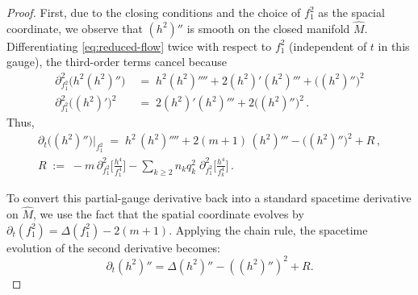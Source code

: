 \documentclass[11pt]{amsart}
\theoremstyle{plain}
\numberwithin{equation}{section}
\theoremstyle{definition}
\theoremstyle{remark}
\begin{document}
\begin{proof}
First, due to the closing conditions and the choice of $f_1^2$ as the spacial coordinate, we observe that $( h^2 )''$ is smooth on the closed manifold $\widehat{M}$. Differentiating \eqref{eq:reduced-flow} twice with respect to $f_1^2$ (independent of $t$ in this gauge), the third-order terms cancel because
\begin{align*}
		\partial_{f_1^2}^2 \big( h^2 ( h^2 )'' \big) &\;=\; h^2 ( h^2 )'''' + 2 ( h^2 )' ( h^2 )''' + \big( ( h^2 )'' \big)^2 \\
		\partial_{f_1^2}^2 \big( ( h^2 )' \big)^2 &\;=\; 2 ( h^2 )' ( h^2 )''' + 2 \big( ( h^2 )'' \big)^2 \,.
\end{align*}
Thus, 
\begin{equation*}
	\begin{gathered}
		\partial_t \big( ( h^2 )'' \big) \Big|_{f_1^2} \;=\; h^2\, ( h^2 )'''' + 2 ( m + 1 )\, ( h^2 )''' - \big( ( h^2 )'' \big)^2 + R \,, \\
		R \;:=\; - m\, \partial_{f_1^2}^2 \Big[ \frac{h^4}{f_1^4} \Big] - \sum_{k \geq 2} n_k q_k^2\; \partial_{f_1^2}^2 \Big[ \frac{h^4}{f_k^4} \Big] \,.
	\end{gathered}
\end{equation*}
	
	
To convert this partial-gauge derivative back into a standard spacetime derivative on $\widehat{M}$, we use the fact that the spatial coordinate evolves by $\partial_t (f_1^2) = \Delta(f_1^2) - 2(m+1)$. Applying the chain rule, the spacetime evolution of the second derivative becomes:
\begin{equation}
	\partial_t (h^2)'' =\Delta (h^2)'' - ((h^2)'')^2 + R.
\end{equation}





\end{proof}
\end{document}
